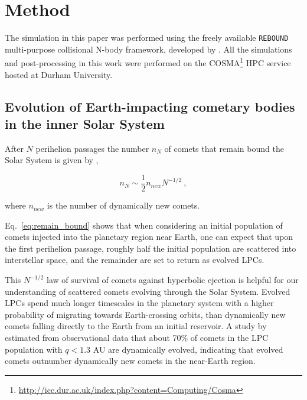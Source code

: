 \chapter{Method}
\label{chap:method}


The simulation in this paper was performed using the freely available \texttt{REBOUND} multi-purpose collisional N-body framework, developed by \cite{2012A&A...537A.128R}. All the simulations and post-processing in this work were performed on the COSMA\footnote{\url{http://icc.dur.ac.uk/index.php?content=Computing/Cosma}} HPC service hosted at Durham University.
\section{Evolution of Earth-impacting cometary bodies in the inner Solar System}
\label{method:evol}
After $N$ perihelion passages the number $n_N$ of comets that remain bound the Solar System is given by \citep{1976NASSP.393..445E},

\vspace{-1ex}
\begin{equation}
    n_N \sim \dfrac{1}{2}n_{new}N^{-1/2}~,
    \label{eq:remain_bound}
\end{equation}

where $n_{new}$ is the number of dynamically new comets.

Eq.~\eqref{eq:remain_bound} shows that when considering an initial population of comets injected into the planetary region near Earth, one can expect that upon the first perihelion passage, roughly half the initial population are scattered into interstellar space, and the remainder are set to return as evolved LPCs.

This $N^{-1/2}$ law of survival of comets against hyperbolic ejection is helpful for our understanding of scattered comets evolving through the Solar System. Evolved LPCs spend much longer timescales in the planetary system with a higher probability of migrating towards Earth-crossing orbits, than dynamically new comets falling directly to the Earth from an initial reservoir. A study by \cite{2012MNRAS.423.1674F} estimated from observational data that about 70\% of comets in the LPC population with $q < 1.3$ AU are dynamically evolved, indicating that evolved comets outnumber dynamically new comets in the near-Earth region. 

